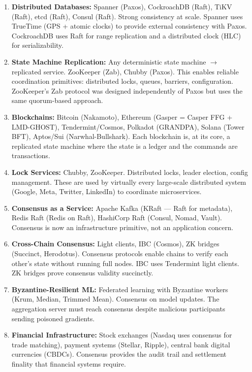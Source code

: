 \begin{enumerate}
\item \textbf{Distributed Databases:} Spanner (Paxos), CockroachDB (Raft), TiKV (Raft), etcd (Raft), Consul (Raft). Strong consistency at scale. Spanner uses TrueTime (GPS + atomic clocks) to provide external consistency with Paxos. CockroachDB uses Raft for range replication and a distributed clock (HLC) for serializability.

\item \textbf{State Machine Replication:} Any deterministic state machine $\to$ replicated service. ZooKeeper (Zab), Chubby (Paxos). This enables reliable coordination primitives: distributed locks, queues, barriers, configuration. ZooKeeper's Zab protocol was designed independently of Paxos but uses the same quorum-based approach.

\item \textbf{Blockchains:} Bitcoin (Nakamoto), Ethereum (Gasper = Casper FFG + LMD-GHOST), Tendermint/Cosmos, Polkadot (GRANDPA), Solana (Tower BFT), Aptos/Sui (Narwhal-Bullshark). Each blockchain is, at its core, a replicated state machine where the state is a ledger and the commands are transactions.

\item \textbf{Lock Services:} Chubby, ZooKeeper. Distributed locks, leader election, config management. These are used by virtually every large-scale distributed system (Google, Meta, Twitter, LinkedIn) to coordinate microservices.

\item \textbf{Consensus as a Service:} Apache Kafka (KRaft — Raft for metadata), Redis Raft (Redis on Raft), HashiCorp Raft (Consul, Nomad, Vault). Consensus is now an infrastructure primitive, not an application concern.

\item \textbf{Cross-Chain Consensus:} Light clients, IBC (Cosmos), ZK bridges (Succinct, Herodotus). Consensus protocols enable chains to verify each other's state without running full nodes. IBC uses Tendermint light clients. ZK bridges prove consensus validity succinctly.

\item \textbf{Byzantine-Resilient ML:} Federated learning with Byzantine workers (Krum, Median, Trimmed Mean). Consensus on model updates. The aggregation server must reach consensus despite malicious participants sending poisoned gradients.

\item \textbf{Financial Infrastructure:} Stock exchanges (Nasdaq uses consensus for trade matching), payment systems (Stellar, Ripple), central bank digital currencies (CBDCs). Consensus provides the audit trail and settlement finality that financial systems require.


\end{enumerate}

